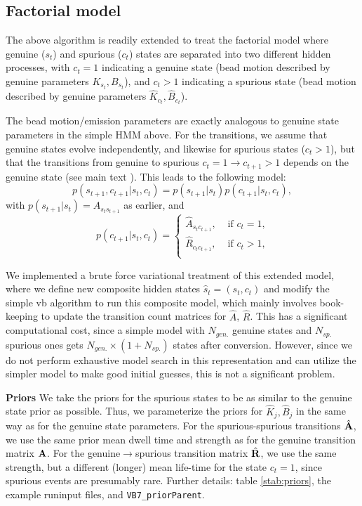 \subsection{Factorial model}
The above algorithm is readily extended to treat the factorial model
where genuine ($s_t$) and spurious ($c_t$) states are separated into
two different hidden processes, with $c_t=1$ indicating a genuine
state (bead motion described by genuine parameters $K_{s_t},B_{s_t}$),
and $c_t>1$ indicating a spurious state (bead motion described by
genuine parameters $\hat K_{c_t},\hat B_{c_t}$). 

The bead motion/emission parameters are exactly analogous to genuine
state parameters in the simple HMM above. For the transitions, we
assume that genuine states evolve independently, and likewise for
spurious states ($c_t>1$), but that the transitions from genuine to
spurious $c_t=1 \to c_{t+1}>1$ depends on the genuine state (see main
text \cite{vbTPMpaper}). This leads to the following model:
\begin{equation}
  p(s_{t+1},c_{t+1}|s_t,c_t)=p(s_{t+1}|s_t)p(c_{t+1}|s_t,c_t),
\end{equation}
with $p(s_{t+1}|s_t)=A_{s_ts_{t+1}}$ as earlier, and
\begin{equation}
  p(c_{t+1}|s_t,c_t)
  =\left\{
  \begin{array}{ll}
    \hat A_{s_tc_{t+1}},&\text{ if $c_t=1$,}\\
    \hat R_{c_tc_{t+1}},&\text{ if $c_t>1$,}\\
  \end{array}
  \right.
\end{equation}

We implemented a brute force variational treatment of this extended
model, where we define new composite hidden states $\hat
s_t=(s_t,c_t)$ and modify the simple vb algorithm to run this
composite model, which mainly involves book-keeping to update the
transition count matrices for $\hat A$, $\hat R$.  This has a
significant computational cost, since a simple model with $N_{gen.}$
genuine states and $N_{sp.}$ spurious ones gets
$N_{gen.}\times(1+N_{sp.})$ states after conversion. However, since we
do not perform exhaustive model search in this representation and can
utilize the simpler model to make good initial guesses, this is not a
significant problem.

{\bf Priors} We take the priors for the spurious states to be as
similar to the genuine state prior as possible. Thus, we parameterize
the priors for $\hat K_j,\hat B_j$ in the same way as for the genuine
state parameters. For the spurious-spurious transitions
$\hat{\mathbf{A}}$, we use the same prior mean dwell time and strength
as for the genuine transition matrix $\mathbf{A}$. For the
genuine$\to$spurious transition matrix $\hat{\mathbf{R}}$, we use the
same strength, but a different (longer) mean life-time for the state
$c_t=1$, since spurious events are presumably rare. Further details:
table \ref{stab:priors}, the example runinput files, and
\verb+VB7_priorParent+.

